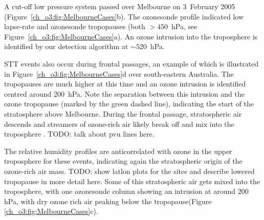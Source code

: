     A cut-off low pressure system passed over Melbourne on 3~February 2005 (Figure~\ref{ch_o3:fig:MelbourneCases}b).
    The ozonesonde profile indicated low lapse-rate and ozonesonde tropopauses (both $> 450$~hPa, see Figure~\ref{ch_o3:fig:MelbourneCases}a). 
    An ozone intrusion into the troposphere is identified by our detection algorithm at $\sim520$~hPa.

    STT events also occur during frontal passages, an example of which is illustrated in Figure~\ref{ch_o3:fig:MelbourneCases}d over south-eastern Australia.
    The tropopauses are much higher at this time and an ozone intrusion is identified centred around 200~hPa.
    Note the separation between this intrusion and the ozone tropopause (marked by the green dashed line), indicating the start of the stratosphere above Melbourne.
    During the frontal passage, stratospheric air descends and streamers of ozone-rich air likely break off and mix into the troposphere \citep{Sprenger2003}.
    TODO: talk about pvu lines here.

    The relative humidity profiles are anticorrelated with ozone in the upper troposphere for these events, indicating again the stratospheric origin of the ozone-rich air mass.
    TODO: show latlon plots for the sites and describe lowered tropopause in more detail here.
    Some of this stratospheric air gets mixed into the troposphere, with one ozonesonde column showing an intrusion at around 200 hPa, with dry ozone rich air peaking below the tropopause(Figure \ref{ch_o3:fig:MelbourneCases}c).
    
